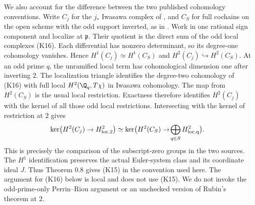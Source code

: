 We also account for the difference between the two published
cohomology conventions. Write $C_j$ for the $j_*$ Iwasawa complex of
\cite[Section 12.1]{kato}, and $C_S$ for full cochains on the open
scheme with the odd support inverted, as in \cite[Section 0.5]{kato1999}.
Work in one rational sign component and localize at $\mathfrak p$.
Their quotient is the direct sum of the odd local complexes (K16).
Each differential has nonzero determinant, so its degree-one
cohomology vanishes. Hence $H^1(C_j)\simeq H^1(C_S)$ and
$H^2(C_j)\hookrightarrow H^2(C_S)$. At an odd prime $q$, the
unramified local term has cohomological dimension one after inverting
$2$. The localization triangle identifies the degree-two cohomology
of (K16) with full local $H^2(\Q_q,T\chi)$ in Iwasawa cohomology.
The map from $H^2(C_S)$ is the usual local restriction. Exactness
therefore identifies $H^2(C_j)$ with the kernel of all those odd
local restrictions. Intersecting with the kernel of restriction at
$2$ gives
\[
 \ker\bigl(H^2(C_j)\to H^2_{\rm loc,2}\bigr)
 \simeq
 \ker\bigl(H^2(C_S)\to\!\bigoplus_{q\in S}H^2_{\rm loc,q}\bigr).
\]
This is precisely the comparison of the subscript-zero groups in
the two sources. The $H^1$ identification preserves the actual
Euler-system class and its coordinate ideal $J$. Thus Theorem 0.8
gives (K15) in the convention used here. The argument for (K16)
below is local and does not use (K15). We do not invoke the
odd-prime-only Perrin--Riou argument or an unchecked version of
Rubin's theorem at $2$.

